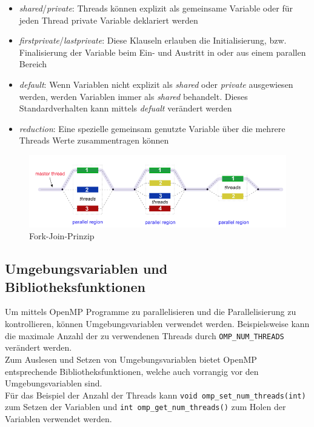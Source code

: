 \documentclass[11pt]{scrartcl}
\begin{document}
\begin{itemize}
\item \textit{shared}/\textit{private}: Threads können explizit als gemeinsame Variable oder für jeden Thread private Variable deklariert werden
\item \textit{firstprivate}/\textit{lastprivate}: Diese Klauseln erlauben die Initialisierung, bzw. Finalisierung der Variable beim Ein- und Austritt in oder aus einem parallen Bereich
\item \textit{default}: Wenn Variablen nicht explizit als \textit{shared} oder \textit{private} ausgewiesen werden, werden Variablen immer als \textit{shared} behandelt. Dieses Standardverhalten kann mittels \textit{defualt} verändert werden \item \textit{reduction}: Eine spezielle gemeinsam genutzte Variable über die mehrere Threads Werte zusammentragen können
\end{itemize}


\begin{figure}[h!]	
\centering
\includegraphics[width=1.0\textwidth]{img/fork_join.png}
\caption{Fork-Join-Prinzip}
\label{join_fork_model}
\end{figure} 

\subsection{Umgebungsvariablen und Bibliotheksfunktionen}

Um mittels OpenMP Programme zu parallelisieren und die Parallelisierung zu kontrollieren, können Umgebungsvariablen verwendet werden. Beispielsweise kann die maximale Anzahl der zu verwendenen Threads durch \texttt{OMP\_NUM\_THREADS} verändert werden.\\ 
Zum Auslesen und Setzen von Umgebungsvariablen bietet OpenMP entsprechende Bibliotheksfunktionen, welche auch vorrangig vor den Umgebungsvariablen sind.\\
Für das Beispiel der Anzahl der Threads kann \texttt{void omp\_set\_num\_threads(int)} zum Setzen der Variablen und \texttt{int omp\_get\_num\_threads()} zum Holen der Variablen verwendet werden. \\
\end{document}
